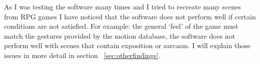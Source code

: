 As I was testing the software many times and I tried to recreate many scenes from RPG games I have noticed that the software does not perform well if certain conditions are not satisfied. For example: the general `feel' of the game must match the gestures provided by the motion database, the software does not perform well with scenes that contain exposition or sarcasm. I will explain those issues in more detail in section ~\ref{sec:otherfindings}.




